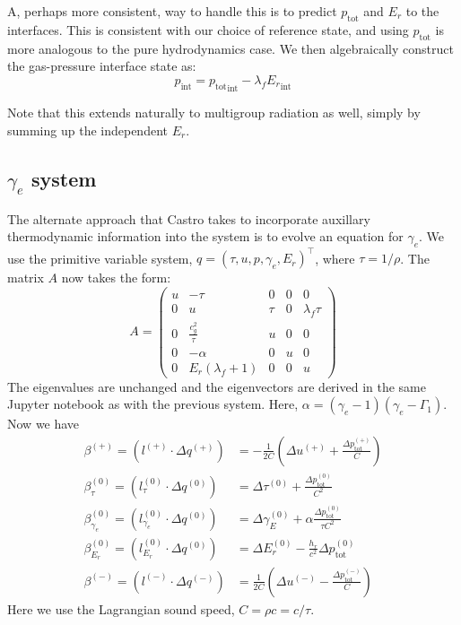 \documentclass[12pt]{article}
\newcommand{\evm}{{(-)}}
\newcommand{\evz}{{(0)}}
\newcommand{\evp}{{(+)}}
\begin{document}
A, perhaps more consistent, way to handle this is to predict $p_\mathrm{tot}$
and $E_r$ to the interfaces.  This is consistent with our choice of
reference state, and using $p_\mathrm{tot}$ is more analogous to the
pure hydrodynamics case.  We then algebraically construct the
gas-pressure interface state as:
\begin{equation}
p_\mathrm{int} = {p_\mathrm{tot}}_\mathrm{int} - \lambda_f {E_r}_\mathrm{int}
\end{equation}

Note that this extends naturally to multigroup radiation as well, simply by
summing up the independent $E_r$.

\subsection*{$\gamma_e$ system}

The alternate approach that Castro takes to incorporate auxillary
thermodynamic information into the system is to evolve an equation for
$\gamma_e$.  We use the primitive variable system, $q = (\tau, u, p,
\gamma_e, E_r)^\intercal$, where $\tau = 1/\rho$.  The matrix $A$ now
takes the form:
\begin{equation}
A = \left (
   \begin{matrix}
   u & - \tau & 0 & 0 & 0\\
   0 & u & \tau & 0 & \lambda_f \tau\\
   0 & \frac{c_{g}^{2}}{\tau} & u & 0 & 0\\
   0 & - \alpha & 0 & u & 0\\
   0 & E_{r} \left(\lambda_f + 1\right) & 0 & 0 & u
\end{matrix}\right)
\end{equation}
The eigenvalues are unchanged and the eigenvectors are derived in the
same Jupyter notebook as with the previous system.  
Here, $\alpha = (\gamma_e - 1)(\gamma_e - \Gamma_1)$.
Now we have
\begin{align}
\beta^\evp = ( l^\evp \cdot \Delta q^\evp ) &= -\frac{1}{2C}
   \left ( \Delta u^\evp + \frac{\Delta p_\mathrm{tot}^\evp}{C} \right ) \\
\beta^\evz_\tau = ( l^\evz_\tau \cdot \Delta q^\evz ) &= 
   \Delta \tau^\evz + \frac{\Delta p_\mathrm{tot}^\evz}{C^2} \\
\beta^\evz_{\gamma_e} = ( l^\evz_{\gamma_e} \cdot \Delta q^\evz ) &= 
   \Delta \gamma_E^\evz + \alpha \frac{\Delta p_\mathrm{tot}^\evz}{\tau C^2} \\
\beta^\evz_{E_r} = ( l^\evz_{E_r} \cdot \Delta q^\evz ) &= 
   \Delta E_r^\evz - \frac{h_r}{c^2} \Delta p_\mathrm{tot}^\evz \\
\beta^\evm = ( l^\evm \cdot \Delta q^\evm ) &= \frac{1}{2C} 
   \left ( \Delta u^\evm - \frac{\Delta p_\mathrm{tot}^\evm}{C} \right ) 
\end{align}
Here we use the Lagrangian sound speed, $C = \rho c = c/\tau$.
\end{document}
